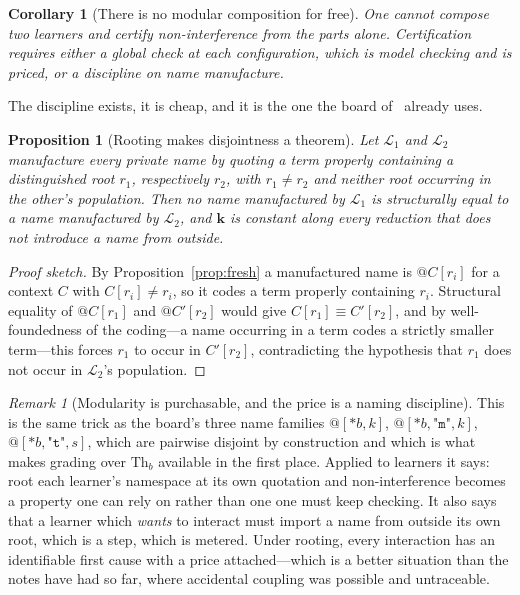 \documentclass[11pt,a4paper]{article}
\theoremstyle{plain}
\newtheorem{proposition}[theorem]{Proposition}
\newtheorem{corollary}[theorem]{Corollary}
\theoremstyle{definition}
\theoremstyle{remark}
\newtheorem{remark}[theorem]{Remark}
\newcommand{\Lrn}{\mathcal{L}}
\newcommand{\Th}{\mathrm{Th}}
\begin{document}
\begin{corollary}[There is no modular composition for free]
One cannot compose two learners and certify non-interference from the parts alone. Certification
requires either a global check at each configuration, which is model checking and is priced, or a
discipline on name manufacture.
\end{corollary}

The discipline exists, it is cheap, and it is the one the board of~\cite[\S4]{game} already uses.

\begin{proposition}[Rooting makes disjointness a theorem]\label{prop:root}
Let $\Lrn_1$ and $\Lrn_2$ manufacture every private name by quoting a term properly containing a
distinguished root $r_1$, respectively $r_2$, with $r_1 \neq r_2$ and neither root occurring in
the other's population. Then no name manufactured by $\Lrn_1$ is structurally equal to a name
manufactured by $\Lrn_2$, and $\mathbf{k}$ is constant along every reduction that does not
introduce a name from outside.
\end{proposition}

\begin{proof}[Proof sketch]
By Proposition~\ref{prop:fresh} a manufactured name is $@C[r_i]$ for a context $C$ with
$C[r_i] \neq r_i$, so it codes a term properly containing $r_i$. Structural equality of
$@C[r_1]$ and $@C'[r_2]$ would give $C[r_1] \equiv C'[r_2]$, and by well-foundedness of the
coding---a name occurring in a term codes a strictly smaller term---this forces $r_1$ to occur in
$C'[r_2]$, contradicting the hypothesis that $r_1$ does not occur in $\Lrn_2$'s population.
\end{proof}

\begin{remark}[Modularity is purchasable, and the price is a naming discipline]
This is the same trick as the board's three name families $@[*b,k]$, $@[*b,\texttt{"m"},k]$,
$@[*b,\texttt{"t"},s]$, which are pairwise disjoint by construction and which is what makes
grading over $\Th_b$ available in the first place. Applied to learners it says: root each
learner's namespace at its own quotation and non-interference becomes a property one can rely on
rather than one one must keep checking. It also says that a learner which \emph{wants} to
interact must import a name from outside its own root, which is a step, which is metered. Under
rooting, every interaction has an identifiable first cause with a price attached---which is a
better situation than the notes have had so far, where accidental coupling was possible and
untraceable.
\end{remark}
\end{document}
